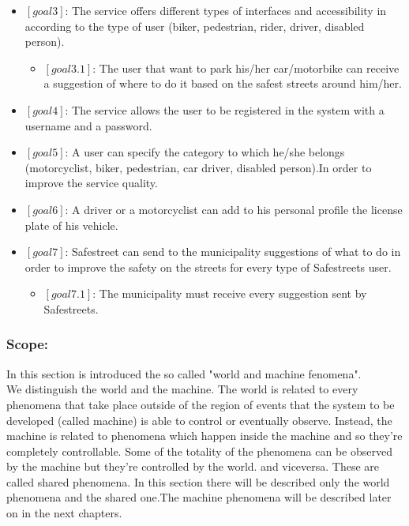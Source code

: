 \documentclass[titlepage]{article}
\begin{document}
\begin{itemize}
\begin{itemize}
      \end{itemize}
\item $[goal 3]$: The service offers different types of 						  interfaces and accessibility in according 					  to the type of user (biker, pedestrian, 						  rider, driver, disabled person).
	\begin{itemize}
	\item $[goal 3.1]$: The user that want to park his/her  							car/motorbike can receive a                           						suggestion of where to do it 
						based on the safest streets around 								him/her.\\
	\end{itemize}

\item $[goal 4]$: The service allows the user to be 							  registered in the system with a username 				  		  and a password.\\

\item $[goal 5]$: A user can specify the category to which 						  he/she belongs (motorcyclist, biker, 							  pedestrian, car driver, disabled person).In 				  order to improve the service quality.\\

\item $[goal 6]$: A driver or a motorcyclist can add to his 					  personal profile the license plate of his 					  vehicle.\\

\item $[goal 7]$: Safestreet can send to the municipality 						  suggestions of what to do in order to 						  improve the safety on the streets for every 
				  type of Safestreets user.
	\begin{itemize}
	\item $[goal 7.1]$: The municipality must receive every 
					    suggestion sent by Safestreets.\\
					   
	
	\end{itemize}

\end{itemize}

\subsubsection{Scope:}
In this section is introduced the so called "world and machine fenomena".\\
We distinguish the world and the machine. The world is related to every phenomena that take place outside of the region of events that the system to be developed (called machine) is able to control or eventually observe. Instead, the machine is related to phenomena which happen inside the machine and so they're completely controllable. Some of the totality of the phenomena can be observed by the machine but they're controlled by the world.  and viceversa. These are called shared phenomena. In this section there will be described only the world phenomena and the shared one.The machine phenomena will be described later on in the next chapters.
\end{document}
